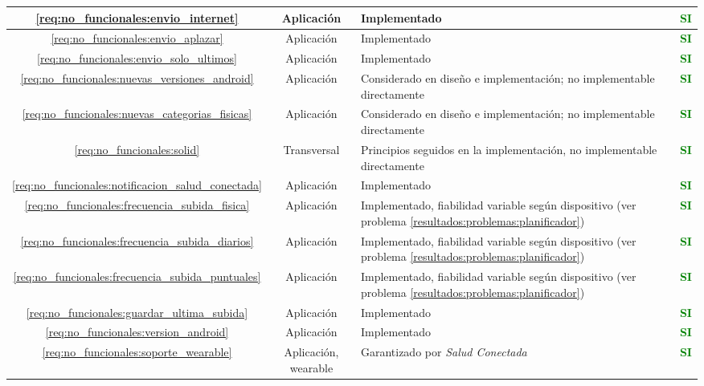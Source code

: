 \begin{xltabular}{\textwidth}{|c|c|X|c|}
        \ref{req:no_funcionales:envio_internet} & Aplicación & Implementado & \textcolor{green}{\textbf{SI}} \\
        \hline
        \ref{req:no_funcionales:envio_aplazar} & Aplicación & Implementado & \textcolor{green}{\textbf{SI}} \\
        \hline
        \ref{req:no_funcionales:envio_solo_ultimos} & Aplicación & Implementado & \textcolor{green}{\textbf{SI}} \\
        \hline
        \ref{req:no_funcionales:nuevas_versiones_android} & Aplicación & Considerado en diseño e implementación; no implementable directamente & \textcolor{green}{\textbf{SI}} \\
        \hline
        \ref{req:no_funcionales:nuevas_categorias_fisicas} & Aplicación & Considerado en diseño e implementación; no implementable directamente & \textcolor{green}{\textbf{SI}} \\
        \hline
        \ref{req:no_funcionales:solid} & Transversal & Principios seguidos en la implementación, no implementable directamente & \textcolor{green}{\textbf{SI}} \\
        \hline
        \ref{req:no_funcionales:notificacion_salud_conectada} & Aplicación & Implementado & \textcolor{green}{\textbf{SI}} \\
        \hline
        \ref{req:no_funcionales:frecuencia_subida_fisica} & Aplicación & Implementado, fiabilidad variable según dispositivo (ver problema \ref{resultados:problemas:planificador}) & \textcolor{green}{\textbf{SI}} \\
        \hline
        \ref{req:no_funcionales:frecuencia_subida_diarios} & Aplicación & Implementado, fiabilidad variable según dispositivo (ver problema \ref{resultados:problemas:planificador}) & \textcolor{green}{\textbf{SI}} \\
        \hline
        \ref{req:no_funcionales:frecuencia_subida_puntuales} & Aplicación & Implementado, fiabilidad variable según dispositivo (ver problema \ref{resultados:problemas:planificador}) & \textcolor{green}{\textbf{SI}} \\
        \hline
        \ref{req:no_funcionales:guardar_ultima_subida} & Aplicación & Implementado & \textcolor{green}{\textbf{SI}} \\
        \hline
        \ref{req:no_funcionales:version_android} & Aplicación & Implementado & \textcolor{green}{\textbf{SI}} \\
        \hline
        \ref{req:no_funcionales:soporte_wearable} & Aplicación, \gls{wearable} & Garantizado por \textit{Salud Conectada} & \textcolor{green}{\textbf{SI}} \\

\end{xltabular}
